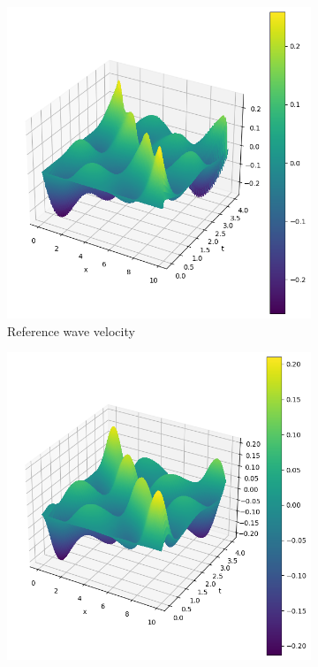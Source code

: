 \begin{figure}[h]
    \centering
    \begin{subfigure}[b]{0.45\textwidth}
        \centering
        \includegraphics[width=\textwidth]{images/inhomogeneous_swe_pseudospectral_velocity.png}
        \caption{Reference wave velocity}
        \label{fig:inhomogeneous_pseudospectral_swe_velocity}
    \end{subfigure}
    \hfill
    \begin{subfigure}[b]{0.45\textwidth}
        \centering
        \includegraphics[width=\textwidth]{images/inhomogeneous_swe_pinn_velocity.png}

\end{subfigure}
\end{figure}
